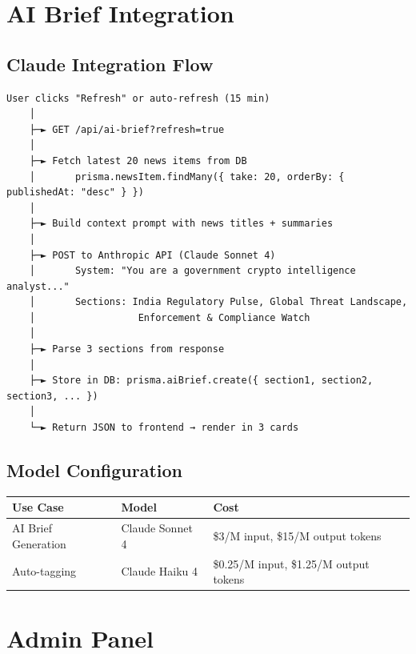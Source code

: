 \documentclass[12pt,a4paper]{article}
\begin{document}
\newpage

\section{AI Brief Integration}

\subsection{Claude Integration Flow}

\begin{verbatim}
User clicks "Refresh" or auto-refresh (15 min)
    │
    ├─► GET /api/ai-brief?refresh=true
    │
    ├─► Fetch latest 20 news items from DB
    │       prisma.newsItem.findMany({ take: 20, orderBy: { publishedAt: "desc" } })
    │
    ├─► Build context prompt with news titles + summaries
    │
    ├─► POST to Anthropic API (Claude Sonnet 4)
    │       System: "You are a government crypto intelligence analyst..."
    │       Sections: India Regulatory Pulse, Global Threat Landscape,
    │                  Enforcement & Compliance Watch
    │
    ├─► Parse 3 sections from response
    │
    ├─► Store in DB: prisma.aiBrief.create({ section1, section2, section3, ... })
    │
    └─► Return JSON to frontend → render in 3 cards
\end{verbatim}

\subsection{Model Configuration}

\begin{center}
\begin{tabular}{lll}
\toprule
\textbf{Use Case} & \textbf{Model} & \textbf{Cost} \\
\midrule
AI Brief Generation & Claude Sonnet 4 & \$3/M input, \$15/M output tokens \\
Auto-tagging & Claude Haiku 4 & \$0.25/M input, \$1.25/M output tokens \\
\bottomrule
\end{tabular}
\end{center}

\newpage

\section{Admin Panel}
\end{document}
